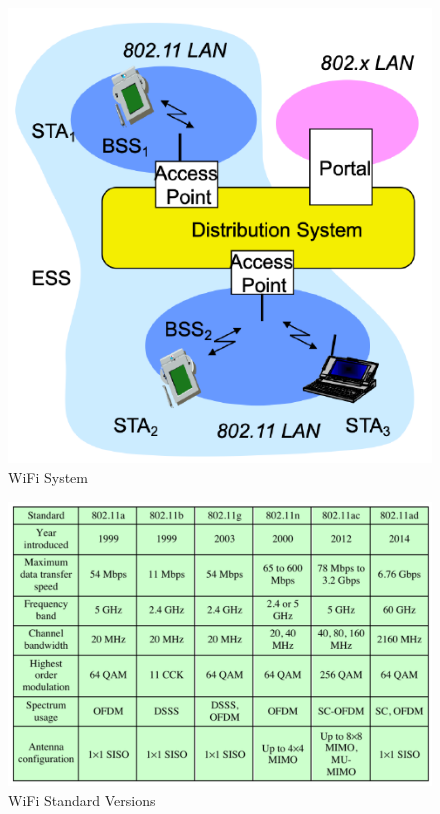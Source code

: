 \begin{figure}[h]
	\centering
	\includegraphics[scale=0.5]{images/9-wifi-terminology.png}
	\caption{WiFi System}%
	\label{fig:wifi-terminology}
\end{figure}

\begin{figure}[h]
	\centering
	\includegraphics[scale=0.4]{images/9-wifi-versions.png}
	\caption{WiFi Standard Versions}%
	\label{fig:wifi-versions}
\end{figure}

